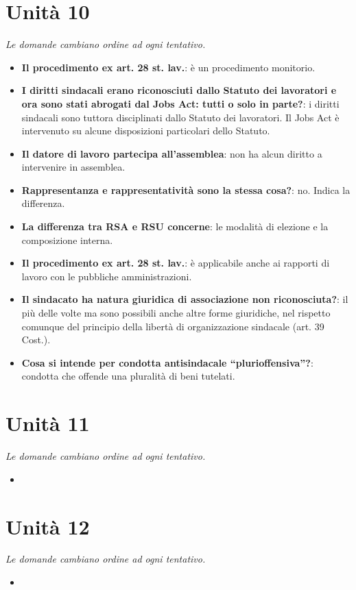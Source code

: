 \documentclass[12pt, a4paper]{report}
\begin{document}
\chapter{Unità 10}
    \textit{Le domande cambiano ordine ad ogni tentativo.}
    \begin{itemize}
        \item \textbf{Il procedimento ex art. 28 st. lav.}: è un procedimento monitorio.
        \item \textbf{I diritti sindacali erano riconosciuti dallo Statuto dei lavoratori e ora sono stati abrogati dal Jobs Act: tutti o solo in parte?}: i diritti sindacali sono tuttora disciplinati dallo Statuto dei lavoratori. Il Jobs Act è intervenuto su alcune disposizioni particolari dello Statuto.
        \item \textbf{Il datore di lavoro partecipa all’assemblea}: non ha alcun diritto a intervenire in assemblea.
        \item \textbf{Rappresentanza e rappresentatività sono la stessa cosa?}: no. Indica la differenza.
        \item \textbf{La differenza tra RSA e RSU concerne}: le modalità di elezione e la composizione interna.
        \item \textbf{Il procedimento ex art. 28 st. lav.}: è applicabile anche ai rapporti di lavoro con le pubbliche amministrazioni.
        \item \textbf{Il sindacato ha natura giuridica di associazione non riconosciuta?}: il più delle volte ma sono possibili anche altre forme giuridiche, nel rispetto comunque del principio della libertà di organizzazione sindacale (art. 39 Cost.).
        \item \textbf{Cosa si intende per condotta antisindacale “plurioffensiva”?}: condotta che offende una pluralità di beni tutelati.
    \end{itemize}
\chapter{Unità 11}
    \textit{Le domande cambiano ordine ad ogni tentativo.}
    \begin{itemize}
        \item 
    \end{itemize}
\chapter{Unità 12}
    \textit{Le domande cambiano ordine ad ogni tentativo.}
    \begin{itemize}
        \item 
    \end{itemize}
\end{document}
